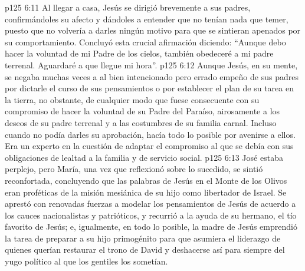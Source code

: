 \vs p125 6:11 Al llegar a casa, Jesús se dirigió brevemente a sus padres, confirmándoles su afecto y dándoles a entender que no tenían nada que temer, puesto que no volvería a darles ningún motivo para que se sintieran apenados por su comportamiento. Concluyó esta crucial afirmación diciendo: “Aunque debo hacer la voluntad de mi Padre de los cielos, también obedeceré a mi padre terrenal. Aguardaré a que llegue mi hora”.
\vs p125 6:12 \pc Aunque Jesús, en su mente, se negaba muchas veces a  al bien intencionado pero errado empeño de sus padres por dictarle el curso de sus pensamientos o por establecer el plan de su tarea en la tierra, no obstante, de cualquier modo que fuese consecuente con su compromiso de hacer la voluntad de su Padre del Paraíso,  airosamente a los deseos de su padre terrenal y a las costumbres de su familia carnal. Incluso cuando no podía darles su aprobación, hacía todo lo posible por avenirse a ellos. Era un experto en la cuestión de adaptar el compromiso al que se debía con sus obligaciones de lealtad a la familia y de servicio social.
\vs p125 6:13 \pc José estaba perplejo, pero María, una vez que reflexionó sobre lo sucedido, se sintió reconfortada, concluyendo que las palabras de Jesús en el Monte de los Olivos eran proféticas de la misión mesiánica de su hijo como libertador de Israel. Se aprestó con renovadas fuerzas a modelar los pensamientos de Jesús de acuerdo a los cauces nacionalistas y patrióticos, y recurrió a la ayuda de su hermano, el tío favorito de Jesús; e, igualmente, en todo lo posible, la madre de Jesús emprendió la tarea de preparar a su hijo primogénito para que asumiera el liderazgo de quienes querían restaurar el trono de David y deshacerse así para siempre del yugo político al que los gentiles los sometían.
